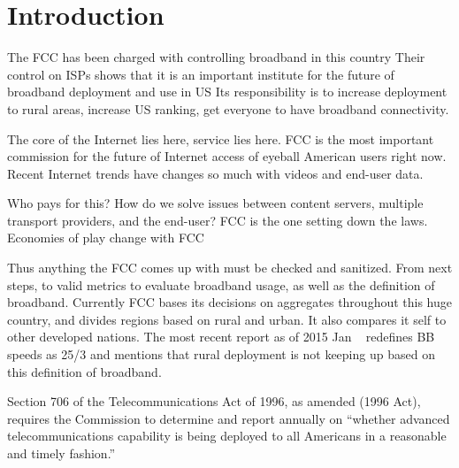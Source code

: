 \section{Introduction}
\label{sec:intro}
The FCC has been charged with controlling broadband in this country
Their control on ISPs shows that it is an important institute for the future of broadband deployment and use in US
Its responsibility is to increase deployment to rural areas, increase US ranking, get everyone to have broadband connectivity.


The core of the Internet lies here, service lies here. FCC is the most important commission for the future of Internet access of eyeball American users right now.
Recent Internet trends have changes so much with videos and end-user data.


Who pays for this? How do we solve issues between content servers, multiple transport providers, and the end-user? FCC is the one setting down the laws. Economies of play change with FCC



Thus anything the FCC comes up with must be checked and sanitized. From next steps, to valid metrics to evaluate broadband usage, as well as the definition of broadband. Currently FCC bases its decisions on aggregates throughout this huge country, and divides regions based on rural and urban. It also compares it self to other developed nations. The most recent report as of 2015 Jan ~\cite{fcc2015broadband-report} redefines BB speeds as 25/3 and mentions that rural deployment is not keeping up based on this definition of broadband.

Section 706 of the Telecommunications Act of 1996, as amended (1996 Act), requires the Commission to determine and report annually on ``whether advanced telecommunications capability is being deployed to all Americans in a reasonable and timely fashion.''


